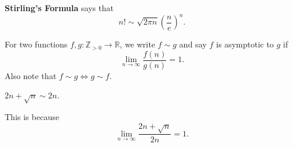 
\begin{theorem}
	\textbf{Stirling's Formula} says that \[
		n! \sim \sqrt{2\pi n} \left( \frac{n}{e} \right) ^{n} 
	.\] 
\end{theorem}

\begin{definition}
	For two functions \( f,g:\mathbb{Z}_{>0} \to \mathbb{R} \), we write \( f \sim g \) and say \( f \) is asymptotic to \( g \) if \[
		\lim_{n \to \infty} \frac{f(n)}{g(n)} = 1
	.\] Also note that \( f\sim g \iff g \sim f \).
\end{definition}

\begin{eg}
	\( 2n + \sqrt{n} \sim 2n \).
\end{eg}
\begin{explanation}
	This is because \[
		\lim_{n \to \infty} \frac{2n+\sqrt{n} }{2n} = 1
	.\] 
\end{explanation}
